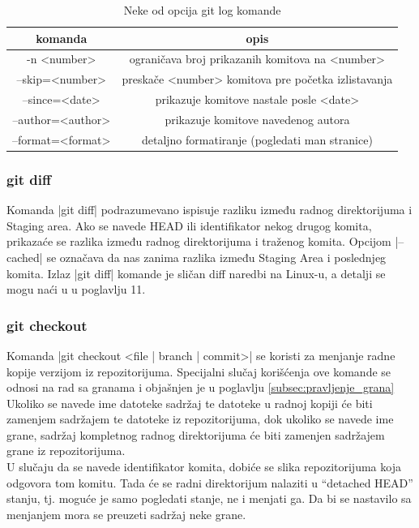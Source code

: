 \documentclass[a4paper]{article}
\begin{document}
{\begin{table}[h!]
\begin{center}


\begin{tabular}{cc} \hline
komanda & opis\\ \hline
-n <number> & ograničava broj prikazanih komitova na <number> \\
--skip=<number> & preskače <number> komitova pre početka izlistavanja \\
--since=<date> & prikazuje komitove nastale posle <date> \\
--author=<author> & prikazuje komitove navedenog autora \\
--format=<format> & detaljno formatiranje (pogledati man stranice)
\end{tabular}
\caption{Neke od opcija git log komande}
\end{center}
\label{tab:tabela1}

\end{table}


\subsubsection*{git diff}
\label{subsec:git_diff}
Komanda |git diff| podrazumevano ispisuje razliku između radnog direktorijuma i Staging area. 
Ako se navede HEAD ili identifikator nekog drugog komita, prikazaće se razlika između radnog direktorijuma i traženog komita. Opcijom |--cached| se označava da nas zanima razlika između Staging Area i poslednjeg komita.
Izlaz |git diff| komande je sličan diff naredbi na Linux-u, a detalji se mogu naći u \cite{pocketguide} u poglavlju 11.


\subsubsection*{git checkout}
\label{checkout}
Komanda |git checkout <file | branch | commit>| se koristi za menjanje radne kopije verzijom iz repozitorijuma. Specijalni slučaj korišćenja ove komande se odnosi na rad sa granama i objašnjen je u poglavlju \ref{subsec:pravljenje_grana}\\
Ukoliko se navede ime datoteke sadržaj te datoteke u radnoj kopiji će biti zamenjem sadržajem te datoteke iz repozitorijuma, dok ukoliko se navede ime grane, sadržaj kompletnog radnog direktorijuma će biti zamenjen sadržajem grane iz repozitorijuma.\\
U slučaju da se navede identifikator komita, dobiće se slika repozitorijuma koja odgovora tom komitu. Tada će se radni direktorijum nalaziti u ``detached HEAD'' stanju, tj. moguće je samo pogledati stanje, ne i menjati ga. Da bi se nastavilo sa menjanjem mora se preuzeti sadržaj neke grane.

}
\end{document}
